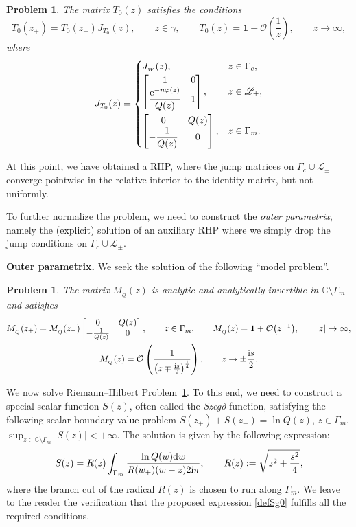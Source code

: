 \documentclass[pdftex]{sigma}
\numberwithin{equation}{section}
\newtheorem{problem}[Theorem]{Problem}
\theoremstyle{definition}
\def \scr{\mathscr}
\def\le{\left}
\def\ri{\right}
\def \d{{\mathrm d}}
\def\be{\begin{equation}}
\def\ee{\end{equation}}
\def \1{\mathbf 1}
\def\C{{\mathbb C}}
\begin{document}
\begin{problem}
\label{RHPT0}
The matrix $T_0(z)$ satisfies the conditions
\[
T_0(z_+)= T_0(z_-) J_{T_0}(z), \qquad z\in \gamma,\qquad
T_0(z) = \1 + \mathcal O\le(\frac 1 z \ri), \qquad z\to \infty,
\]
where
\[
J_{T_0}(z) =
\begin{cases}
J_{_W}(z), & z\in \Gamma_c,\\
 \begin{bmatrix}
1 & 0 \\
\displaystyle\frac{ {\rm e}^{-n\varphi(z)}}{Q(z)} & 1
\end{bmatrix},
& z\in \scr L_\pm,
\vspace{1mm}\\
\begin{bmatrix}
 0 & Q(z) \\
\displaystyle -\frac 1 {Q(z)} & 0
\end{bmatrix},
 & z\in \Gamma_m.
\end{cases}
\]
\end{problem}
At this point, we have obtained a RHP, where the jump matrices on $\Gamma_{c} \cup \scr L_\pm$ converge pointwise in the relative interior to the identity matrix, but not uniformly.

To further normalize the problem, we need to construct the {\it outer parametrix}, namely the (explicit) solution of an auxiliary RHP where we simply drop the jump conditions on $\Gamma_c\cup \scr L_\pm$.

{\bf Outer parametrix.}
We seek the solution of the following ``model problem''.
\begin{problem}
\label{RHPM0}
The matrix $M_{_Q}(z)$ is analytic and analytically invertible in $\C\setminus \Gamma_m$ and satisfies
\begin{gather*}
M_{_Q}(z_+) = M_{_Q}(z_-) \begin{bmatrix}
0 & Q(z)\\ -\frac 1 {Q(z)} & 0
\end{bmatrix},\qquad z\in \Gamma_m
,\qquad
M_{_Q}(z) = \1 + \mathcal O\bigl(z^{-1}\bigr),\qquad |z|\to \infty,\\
M_{_Q}(z) = \mathcal O\le(\frac 1{ \le(z\mp \frac {{\rm i}s}2\ri)^{\frac 1 4} }\ri),\qquad z\to \pm \frac {{\rm i}s}2.
\end{gather*}
\end{problem}
We now solve Riemann--Hilbert Problem~\ref{RHPM0}.
To this end, we need to construct a special scalar function $S(z)$, often called the {\it Szeg\H{o}} function, satisfying the following scalar boundary value problem
$S(z_+) + S(z_-) = \ln Q(z)$, $ z\in \Gamma_m$, $\sup_{z\in \C\setminus \Gamma_m} | S(z)| <+\infty$.
The solution is given by the following expression:
\be
\label{defSg0}
S(z) = R(z) \int_{\Gamma_m} \frac {\ln Q(w) \d w} {R(w_+) (w-z) 2{\rm i}\pi},\qquad R(z):= \sqrt{z^2 + \frac {s^2}4},
\ee
where the branch cut of the radical $R(z)$ is chosen to run along $\Gamma_m$.
We leave to the reader the verification that the proposed expression \eqref{defSg0} fulfills all the required conditions.
\end{document}
